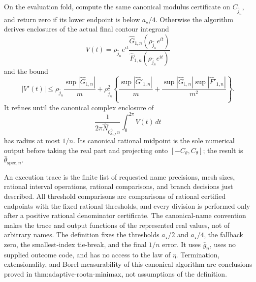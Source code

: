 On the evaluation fold, compute the same canonical modulus certificate on \(C_{\widehat j_n}\), and return zero if its lower endpoint is below \(a_{\star}/4\).  Otherwise the algorithm derives enclosures of the actual final contour integrand
\[
 V(t)=\rho_{\widehat j_n}e^{it}
 \frac{\widehat G_{1,n}(\rho_{\widehat j_n}e^{it})}
      {\widehat F_{1,n}(\rho_{\widehat j_n}e^{it})}
\]
and the bound
\[
 |V'(t)|\le
 \rho_{\widehat j_n}\frac{\sup|\widehat G_{1,n}|}{m}
 +\rho_{\widehat j_n}^2\left\{
 \frac{\sup|\widehat G'_{1,n}|}{m}
 +\frac{\sup|\widehat G_{1,n}|\sup|\widehat F'_{1,n}|}{m^2}
 \right\}.
\]
It refines until the canonical complex enclosure of
\[
 \frac{1}{2\pi\widehat N_{0\widehat j_n,n}}
 \int_0^{2\pi}V(t)\,dt
\]
has radius at most \(1/n\).  Its canonical rational midpoint is the sole numerical output before taking the real part and projecting onto \([-C_{\theta},C_{\theta}]\); the result is \(\widehat\theta_{\mathrm{spec},n}\).

An execution trace is the finite list of requested name precisions, mesh sizes, rational interval operations, rational comparisons, and branch decisions just described.  All threshold comparisons are comparisons of rational certified endpoints with the fixed rational thresholds, and every division is performed only after a positive rational denominator certificate.  The canonical-name convention makes the trace and output functions of the represented real values, not of arbitrary names.  The definition fixes the thresholds \(a_{\star}/2\) and \(a_{\star}/4\), the fallback zero, the smallest-index tie-break, and the final \(1/n\) error.  It uses \(\bar g_n\), uses no supplied outcome code, and has no access to the law of \(\eta\).  Termination, extensionality, and Borel measurability of this canonical algorithm are conclusions proved in \(\text{thm:adaptive-rootn-minimax}\), not assumptions of the definition.